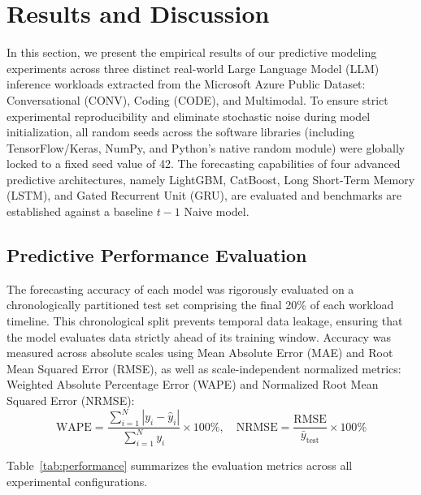 \documentclass[conference, a4paper]{IEEEtran}
\begin{document}

\section{Results and Discussion}
In this section, we present the empirical results of our predictive modeling experiments across three distinct real-world Large Language Model (LLM) inference workloads extracted from the Microsoft Azure Public Dataset: Conversational (CONV), Coding (CODE), and Multimodal. To ensure strict experimental reproducibility and eliminate stochastic noise during model initialization, all random seeds across the software libraries (including TensorFlow/Keras, NumPy, and Python's native random module) were globally locked to a fixed seed value of 42. The forecasting capabilities of four advanced predictive architectures, namely LightGBM, CatBoost, Long Short-Term Memory (LSTM), and Gated Recurrent Unit (GRU), are evaluated and benchmarks are established against a baseline $t-1$ Naive model.


\subsection{Predictive Performance Evaluation}
The forecasting accuracy of each model was rigorously evaluated on a chronologically partitioned test set comprising the final 20\% of each workload timeline. This chronological split prevents temporal data leakage, ensuring that the model evaluates data strictly ahead of its training window. Accuracy was measured across absolute scales using Mean Absolute Error (MAE) and Root Mean Squared Error (RMSE), as well as scale-independent normalized metrics: Weighted Absolute Percentage Error (WAPE) and Normalized Root Mean Squared Error (NRMSE):
$$\text{WAPE} = \frac{\sum_{i=1}^{N} |y_i - \hat{y}_i|}{\sum_{i=1}^{N} y_i} \times 100\%, \quad \text{NRMSE} = \frac{\text{RMSE}}{\bar{y}_{\text{test}}} \times 100\%$$


Table~\ref{tab:performance} summarizes the evaluation metrics across all experimental configurations.
\end{document}
